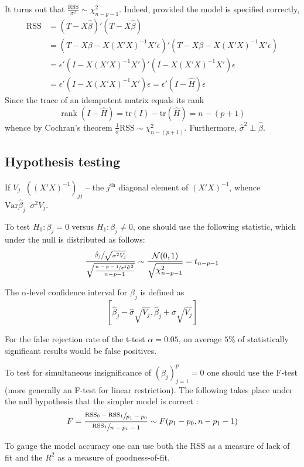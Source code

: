 \documentclass[a4paper]{article}
\newcommand{\clo}[1]{{\left [ #1 \right ]}}
\newcommand{\brac}[1]{{\left ( #1 \right )}}
\newcommand{\Ncal}{\mathcal{N}}
\newcommand{\Var}[0]{{\text{Var}}}
\newcommand{\RSS}{\text{RSS}}
\newcommand{\tr}{\text{tr}}
\newcommand{\rank}{\mathop{\text{rank}}\nolimits}
\newcommand{\defn}{\mathop{\overset{\Delta}{=}}\nolimits}
\begin{document}
It turns out that $\frac{\RSS}{\sigma^2}\sim \chi^2_{n-p-1}$.
Indeed, provided the model is specified correctly, \begin{align*}
	\RSS &= \brac{T-X\hat{\beta}}'\brac{T-X\hat{\beta}} \\
	& = \brac{T-X\beta - X\brac{X'X}^{-1}X'\epsilon}'\brac{T-X\beta - X\brac{X'X}^{-1}X'\epsilon} \\
	& = \epsilon' \brac{I - X\brac{X'X}^{-1}X'}'\brac{I - X\brac{X'X}^{-1}X'}\epsilon \\
	& = \epsilon' \brac{ I - X\brac{X'X}^{-1}X' } \epsilon = \epsilon' \brac{ I - \hat{H} } \epsilon
\end{align*}
Since the trace of an idempotent matrix equals its rank
\[\rank(I - \hat{H}) = \tr(I) - \tr(\hat{H}) = n- (p+1)\]
whence by Cochran's theorem $\frac{1}{\sigma}\RSS\sim\chi^2_{n-(p+1)}$.
Furthermore, $\hat{\sigma}^2 \perp \hat{\beta}$.

\subsection{Hypothesis testing} %
\label{sub:hypothesis_testing}

If $V_j \defn \brac{\brac{X'X}^{-1}}_{jj}$ -- the $j^\text{th}$ diagonal element
of $\brac{X'X}^{-1}$, whence $\Var\hat{\beta}_j\defn \sigma^2 V_j$.

To test $H_0:\beta_j=0$ versus $H_1:\beta_j\neq 0$, one should use the following
statistic, which under the null is distributed as follows:
\[\frac{\sfrac{\hat{\beta}_j}{\sqrt{\sigma^2 V_j}}}{\sqrt{ \frac{\sfrac{n-p-1}{\sigma^2} \hat{\sigma}^2 }{ n-p-1 } }} \sim \frac{\Ncal(0, 1)}{\sqrt{\chi^2_{n-p-1}}} = t_{n-p-1}\]

The $\alpha$-level confidence interval for $\beta_j$ is defined as
\[\clo{ \hat{\beta}_j - \hat{\sigma} \sqrt{ V_j },  \hat{\beta}_j + \hat{\sigma} \sqrt{ V_j } }\]

For the false rejection rate of the t-test $\alpha = 0.05$, on average $5\%$ of
statistically significant results would be false positives.

To test for simultaneous insignificance of $\brac{\beta_j}_{j=1}^p = 0$ one should
use the F-test (more generally an F-test for linear restriction). The following
takes place under the null hypothesis that the simpler model is correct :
\[F = \frac{\sfrac{\RSS_0-\RSS_1}{p_1-p_0}}{\sfrac{\RSS_1}{n-p_1-1}}\sim F(p_1-p_0, n-p_1-1)\]

To gauge the model accuracy one can use both the RSS as a measure of lack of fit
and the $R^2$ as a measure of goodness-of-fit.
\end{document}
